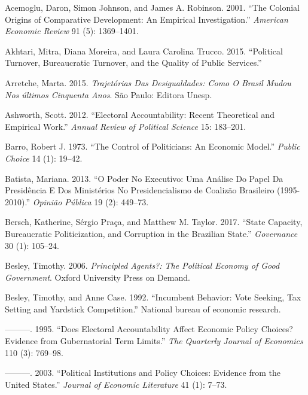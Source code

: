 \documentclass[12pt,]{article}
\begin{document}
\hypertarget{refs}{}
\leavevmode\hypertarget{ref-acemoglu_colonial_2001}{}%
Acemoglu, Daron, Simon Johnson, and James A. Robinson. 2001. ``The
Colonial Origins of Comparative Development: An Empirical
Investigation.'' \emph{American Economic Review} 91 (5): 1369--1401.

\leavevmode\hypertarget{ref-akhtari_political_2015}{}%
Akhtari, Mitra, Diana Moreira, and Laura Carolina Trucco. 2015.
``Political Turnover, Bureaucratic Turnover, and the Quality of Public
Services.''

\leavevmode\hypertarget{ref-arretche_trajetorias_2015}{}%
Arretche, Marta. 2015. \emph{Trajetórias Das Desigualdades: Como O
Brasil Mudou Nos últimos Cinquenta Anos}. São Paulo: Editora Unesp.

\leavevmode\hypertarget{ref-ashworth_electoral_2012}{}%
Ashworth, Scott. 2012. ``Electoral Accountability: Recent Theoretical
and Empirical Work.'' \emph{Annual Review of Political Science} 15:
183--201.

\leavevmode\hypertarget{ref-barro_control_1973}{}%
Barro, Robert J. 1973. ``The Control of Politicians: An Economic
Model.'' \emph{Public Choice} 14 (1): 19--42.

\leavevmode\hypertarget{ref-batista_o_2013}{}%
Batista, Mariana. 2013. ``O Poder No Executivo: Uma Análise Do Papel Da
Presidência E Dos Ministérios No Presidencialismo de Coalizão Brasileiro
(1995-2010).'' \emph{Opinião Pública} 19 (2): 449--73.

\leavevmode\hypertarget{ref-bersch_state_2017}{}%
Bersch, Katherine, Sérgio Praça, and Matthew M. Taylor. 2017. ``State
Capacity, Bureaucratic Politicization, and Corruption in the Brazilian
State.'' \emph{Governance} 30 (1): 105--24.

\leavevmode\hypertarget{ref-besley_principled_2006}{}%
Besley, Timothy. 2006. \emph{Principled Agents?: The Political Economy
of Good Government}. Oxford University Press on Demand.

\leavevmode\hypertarget{ref-besley_incumbent_1992}{}%
Besley, Timothy, and Anne Case. 1992. ``Incumbent Behavior: Vote
Seeking, Tax Setting and Yardstick Competition.'' National bureau of
economic research.

\leavevmode\hypertarget{ref-besley_does_1995}{}%
---------. 1995. ``Does Electoral Accountability Affect Economic Policy
Choices? Evidence from Gubernatorial Term Limits.'' \emph{The Quarterly
Journal of Economics} 110 (3): 769--98.

\leavevmode\hypertarget{ref-besley_political_2003}{}%
---------. 2003. ``Political Institutions and Policy Choices: Evidence
from the United States.'' \emph{Journal of Economic Literature} 41 (1):
7--73.
\end{document}
